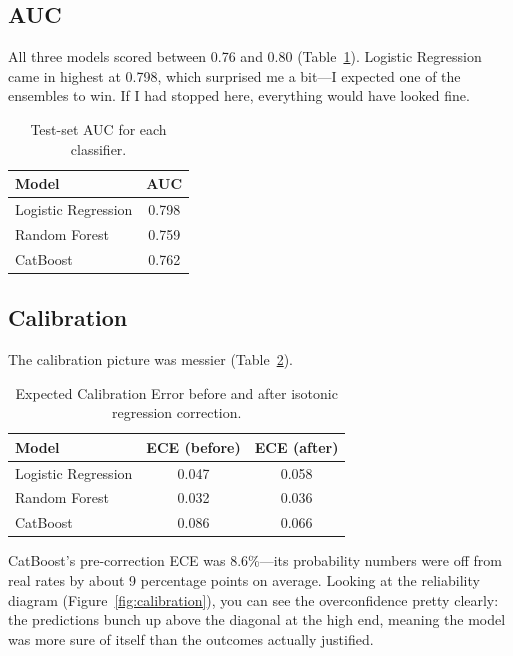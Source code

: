 \documentclass[12pt]{article}
\begin{document}
\subsection{AUC}

All three models scored between 0.76 and 0.80 (Table~\ref{tab:auc}).
Logistic Regression came in highest at 0.798, which surprised me a bit---I
expected one of the ensembles to win. If I had stopped here, everything
would have looked fine.

\begin{table}[htbp]
\centering
\caption{Test-set AUC for each classifier.}
\label{tab:auc}
\begin{tabular}{lc}
\toprule
\textbf{Model} & \textbf{AUC} \\
\midrule
Logistic Regression & 0.798 \\
Random Forest       & 0.759 \\
CatBoost            & 0.762 \\
\bottomrule
\end{tabular}
\end{table}

\subsection{Calibration}

The calibration picture was messier (Table~\ref{tab:ece}).

\begin{table}[htbp]
\centering
\caption{Expected Calibration Error before and after isotonic regression
correction.}
\label{tab:ece}
\begin{tabular}{lcc}
\toprule
\textbf{Model} & \textbf{ECE (before)} & \textbf{ECE (after)} \\
\midrule
Logistic Regression & 0.047 & 0.058 \\
Random Forest       & 0.032 & 0.036 \\
CatBoost            & 0.086 & 0.066 \\
\bottomrule
\end{tabular}
\end{table}

CatBoost's pre-correction ECE was 8.6\%---its probability numbers were off
from real rates by about 9 percentage points on average. Looking at the
reliability diagram (Figure~\ref{fig:calibration}), you can see the
overconfidence pretty clearly: the predictions bunch up above the diagonal
at the high end, meaning the model was more sure of itself than the outcomes
actually justified.
\end{document}
